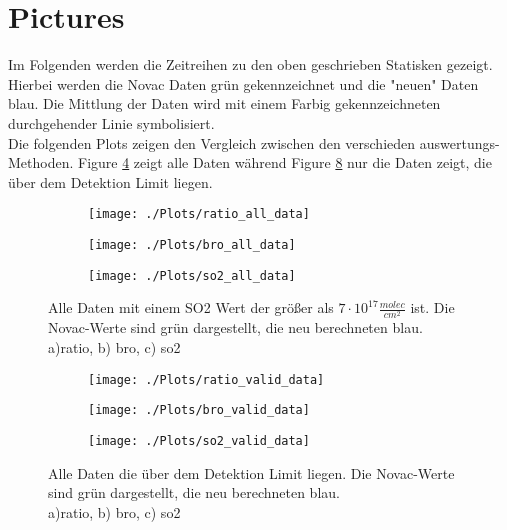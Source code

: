 \documentclass[]{article}
\begin{document}
\section*{Pictures}
%
Im Folgenden werden die Zeitreihen zu den oben geschrieben Statisken gezeigt. Hierbei werden die Novac Daten grün gekennzeichnet und die "neuen" Daten blau. Die Mittlung der Daten wird mit einem Farbig gekennzeichneten durchgehender Linie symbolisiert.\\
%
\newline
%
Die folgenden Plots zeigen den Vergleich zwischen den verschieden auswertungs-Methoden. 
Figure \ref{fig:demo} zeigt alle Daten während Figure \ref{fig:demo1} nur die Daten zeigt, die über dem Detektion Limit liegen.\\
%
\begin{figure}[h]
   \begin{subfigure}[t]{0.33\textwidth} 
		\texttt{[image: ./Plots/ratio\_all\_data]}
		\caption{}
		\label{fig:ratio_all_data}
   \end{subfigure}\hfill%
   \begin{subfigure}[t]{0.33\textwidth} 
	\texttt{[image: ./Plots/bro\_all\_data]}
	\caption{}
	\label{fig:ratio_all_data}
   \end{subfigure} %
   \begin{subfigure}[t]{0.33\textwidth} 
		\texttt{[image: ./Plots/so2\_all\_data]}
		\caption{}
		\label{fig:ratio_all_data}
   \end{subfigure} 
   \caption{Alle Daten mit einem SO2 Wert der größer als $7\cdot10^{17}\frac{molec}{cm^2}$ ist. Die Novac-Werte sind grün dargestellt, die neu berechneten blau.\\ 
   a)ratio, b) bro, c) so2} 
   \label{fig:demo} 
\end{figure} 
%
\begin{figure}[h]
   \begin{subfigure}[t]{0.33\textwidth} 
		\texttt{[image: ./Plots/ratio\_valid\_data]}
		\caption{}
		\label{fig:ratio_all_data}
   \end{subfigure}\hfill%
   \begin{subfigure}[t]{0.33\textwidth} 
	\texttt{[image: ./Plots/bro\_valid\_data]}
	\caption{}
	\label{fig:ratio_all_data}
   \end{subfigure} %
   \begin{subfigure}[t]{0.33\textwidth} 
		\texttt{[image: ./Plots/so2\_valid\_data]}
		\caption{}
		\label{fig:ratio_all_data}
   \end{subfigure} 
   \caption{Alle Daten die über dem Detektion Limit liegen. Die Novac-Werte sind grün dargestellt, die neu berechneten blau.\\
   a)ratio, b) bro, c) so2} 
   \label{fig:demo1} 
\end{figure}
\end{document}

